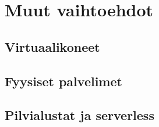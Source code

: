 \chapter{Muut vaihtoehdot\label{options}}

\section{Virtuaalikoneet}


\section{Fyysiset palvelimet}


\section{Pilvialustat ja serverless}

